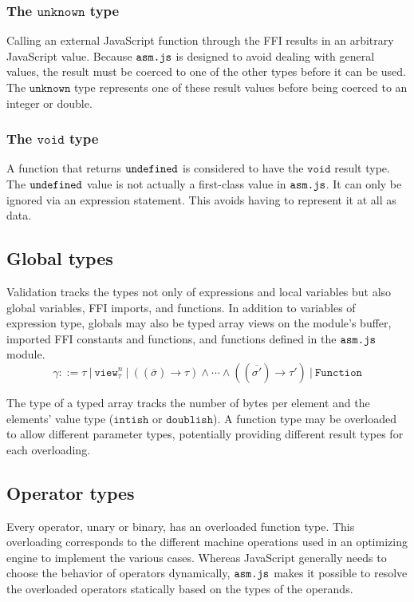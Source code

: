 \documentclass{article}
\newcommand{\funty}[2]{({#1}) \rightarrow {#2}}
\newcommand{\seq}[1]{\overline{{#1}}}
\newcommand{\mathjs}[1]{\mbox{\texttt{{#1}}}}
\newcommand{\view}[2]{\mathtt{view}^{#1}_{#2}}
\newcommand{\unk}{\mathtt{unknown}}
\newcommand{\void}{\mathtt{void}}
\newcommand{\intish}{\mathtt{intish}}
\newcommand{\doublish}{\mathtt{doublish}}
\newcommand{\Fun}{\mathtt{Function}}
\begin{document}
\subsubsection*{The $\unk$ type}

Calling an external JavaScript function through the FFI results in an
arbitrary JavaScript value. Because $\mathjs{asm.js}$ is designed to
avoid dealing with general values, the result must be coerced to one
of the other types before it can be used. The $\unk$ type represents
one of these result values before being coerced to an integer or
double.

\subsubsection*{The $\void$ type}

A function that returns $\mathjs{undefined}$ is considered to have the
$\void$ result type. The $\mathjs{undefined}$ value is not actually a
first-class value in $\mathjs{asm.js}$. It can only be ignored via an
expression statement. This avoids having to represent it at all as
data.

\subsection{Global types}

Validation tracks the types not only of expressions and local
variables but also global variables, FFI imports, and functions. In
addition to variables of expression type, globals may also be typed
array views on the module's buffer, imported FFI constants and
functions, and functions defined in the $\mathjs{asm.js}$ module.
\[
\gamma ::= \tau ~|~ \view{n}{\tau} ~|~ (\funty{\seq{\sigma}}{\tau}) \land \cdots \land (\funty{\seq{\sigma'}}{\tau'}) ~|~ \Fun
\]

The type of a typed array tracks the number of bytes per element and
the elements' value type ($\intish$ or $\doublish$). A function type
may be overloaded to allow different parameter types, potentially
providing different result types for each overloading.

\subsection{Operator types}

Every operator, unary or binary, has an overloaded function type.
This overloading corresponds to the different machine operations used
in an optimizing engine to implement the various cases. Whereas
JavaScript generally needs to choose the behavior of operators
dynamically, $\mathjs{asm.js}$ makes it possible to resolve the
overloaded operators statically based on the types of the operands.
\end{document}
